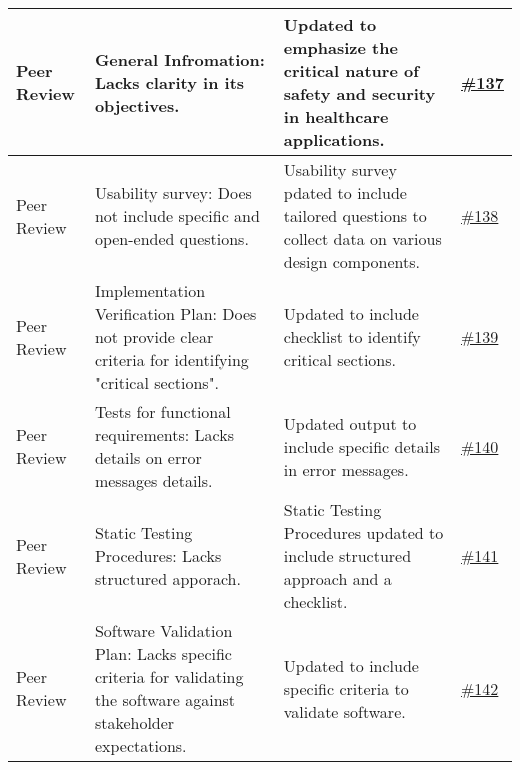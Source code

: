 \documentclass{article}
\begin{document}
\begin{longtable}{| p{} | p{} | p{} | p{} |}
    \hline
    Peer Review & General Infromation: Lacks clarity in its objectives. & Updated to emphasize the critical nature of safety and security in healthcare applications.  & \href{https://github.com/PKALXI/RapidCare/issues/137}{\#137} \\
    \hline
    Peer Review & Usability survey: Does not include specific and open-ended questions. & Usability survey pdated to include tailored questions to collect data on various design components. & \href{https://github.com/PKALXI/RapidCare/issues/138}{\#138} \\
    \hline
    Peer Review & Implementation Verification Plan: Does not provide clear criteria for identifying "critical sections". & Updated to include checklist to identify critical sections. & \href{https://github.com/PKALXI/RapidCare/issues/139}{\#139} \\
    \hline
    Peer Review & Tests for functional requirements: Lacks details on error messages details. & Updated output to include specific details in error messages. & \href{https://github.com/PKALXI/RapidCare/issues/140}{\#140} \\
    \hline
    Peer Review & Static Testing Procedures: Lacks structured apporach. & Static Testing Procedures updated to include structured approach and a checklist. & \href{https://github.com/PKALXI/RapidCare/issues/141}{\#141} \\
    \hline
    Peer Review & Software Validation Plan: Lacks specific criteria for validating the software against stakeholder expectations.  & Updated to include specific criteria to validate software. & \href{https://github.com/PKALXI/RapidCare/issues/142}{\#142} \\
    \hline

\end{longtable}
\end{document}
